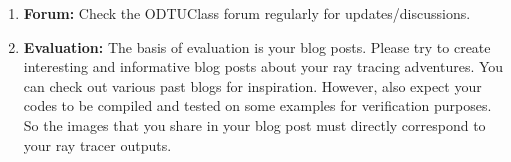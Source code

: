 \documentclass[12pt]{article}
\begin{document}
\begin{enumerate}
\item \textbf{Forum:} Check the ODTUClass forum regularly for
updates/discussions.

\item \textbf{Evaluation:} The basis of evaluation is your blog posts.
Please try to create interesting and informative blog posts about your
ray tracing adventures. You can check out various past blogs for
inspiration. However, also expect your codes to be compiled and tested
on some examples for verification purposes. So the images that you share
in your blog post must directly correspond to your ray tracer outputs.

\end{enumerate}
\end{document}
